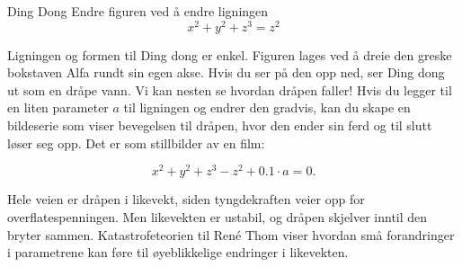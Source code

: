 \begin{surferPage}{Ding Dong}
Endre figuren ved å endre ligningen\\

\smallskip
\[x^2	+ y^2	+ z^3	= z^2\]

\singlespacing
Ligningen og formen til Ding dong er enkel. Figuren lages ved å dreie den greske bokstaven Alfa rundt sin egen akse. Hvis du ser på den opp ned, ser Ding dong ut som en dråpe vann. Vi kan nesten se hvordan dråpen faller! 
\newline
Hvis du legger til en liten parameter $a$ til ligningen og endrer den gradvis, kan du skape en bildeserie som viser bevegelsen til dråpen, hvor den ender sin ferd og til slutt løser seg opp. Det er som stillbilder av en film:

\[x^2	+ y^2	+ z^3	-z^2+0.1\cdot a=0.\]

Hele veien er dråpen i likevekt, siden tyngdekraften veier opp for overflatespenningen. Men likevekten er ustabil, og dråpen skjelver inntil den bryter sammen. Katastrofeteorien til René Thom viser hvordan små forandringer i parametrene kan føre til øyeblikkelige endringer i likevekten.
\end{surferPage}
